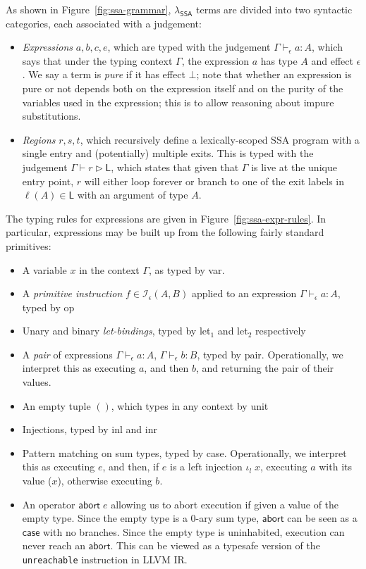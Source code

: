 \documentclass[acmsmall,screen,review]{acmart}
\newcommand{\mc}[1]{\ensuremath{\mathcal{#1}}}
\newcommand{\ms}[1]{\ensuremath{\mathsf{#1}}}
\newcommand{\hasty}[4]{#1 \vdash_{#2} #3: {#4}}
\newcommand{\haslb}[3]{#1 \vdash #2 \rhd #3}
\newcommand{\brle}[1]{{\textsf{#1}}}
\newcommand{\isotopessa}{\(\lambda_{\ms{SSA}}\)}
\begin{document}
As shown in Figure~\ref{fig:ssa-grammar}, \isotopessa{} terms are divided into two syntactic
categories, each associated with a judgement:
\begin{itemize}
  \item \emph{Expressions} $a, b, c, e$, which are typed with the judgement
  $\hasty{\Gamma}{\epsilon}{a}{A}$, which says that under the typing context $\Gamma$, the
  expression $a$ has type $A$ and effect $\epsilon$. We say a term is \emph{pure} if it has effect
  $\bot$; note that whether an expression is pure or not depends both on the expression itself and
  on the purity of the variables used in the expression; this is to allow reasoning about impure
  substitutions.
  \item \emph{Regions} $r, s, t$, which recursively define a lexically-scoped SSA program with a
  single entry and (potentially) multiple exits. This is typed with the judgement
  $\haslb{\Gamma}{r}{\ms{L}}$, which states that given that $\Gamma$ is live at the unique entry
  point, $r$ will either loop forever or branch to one of the exit labels in $\ell(A) \in \ms{L}$
  with an argument of type $A$.
\end{itemize}

The typing rules for expressions are given in Figure~\ref{fig:ssa-expr-rules}. In particular,
expressions may be built up from the following fairly standard primitives:
\begin{itemize}
  \item A variable $x$ in the context $\Gamma$, as typed by \brle{var}.
  \item A \emph{primitive instruction} $f \in \mc{I}_\epsilon(A, B)$ applied to an expression
  $\hasty{\Gamma}{\epsilon}{a}{A}$, typed by \brle{op}
  \item Unary and binary \emph{let-bindings}, typed by \brle{let$_1$} and \brle{let$_2$}
  respectively
  \item A \emph{pair} of expressions $\hasty{\Gamma}{\epsilon}{a}{A}$,
  $\hasty{\Gamma}{\epsilon}{b}{B}$, typed by \brle{pair}. Operationally, we interpret this as
  executing $a$, and then $b$, and returning the pair of their values.
  \item An empty tuple $()$, which types in any context by \brle{unit}
  \item Injections, typed by \brle{inl} and \brle{inr}
  \item Pattern matching on sum types, typed by \brle{case}. Operationally, we interpret this as
  executing $e$, and then, if $e$ is a left injection $\iota_l\;x$, executing $a$ with its value
  ($x$), otherwise executing $b$.
  \item An operator $\ms{abort}\;e$ allowing us to abort execution if given a value of the empty
  type. Since the empty type is a 0-ary sum type, $\ms{abort}$ can be seen as a $\ms{case}$ with no
  branches. Since the empty type is uninhabited, execution can never reach an $\ms{abort}$. This can
  be viewed as a typesafe version of the \texttt{unreachable} instruction in LLVM IR. 
\end{itemize}
\end{document}
